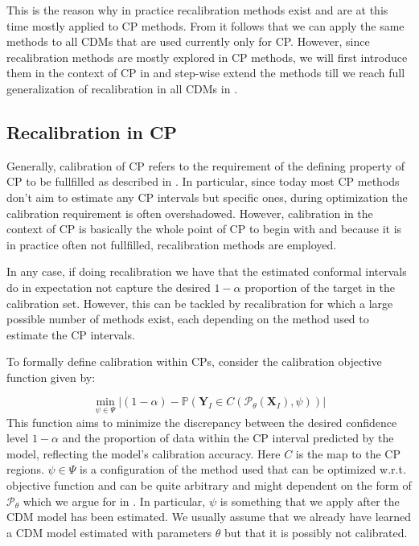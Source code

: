 This is the reason why in practice recalibration methods exist and are at this time mostly applied to CP methods. From  it follows that we can apply the same methods to all CDMs that are used currently only for CP. However, since recalibration methods are mostly explored in CP methods, we will first introduce them in the context of CP in  and step-wise extend the methods till we reach full generalization of recalibration in all CDMs in .

\subsection{Recalibration in CP}\label{sec:recalibration_cp}
Generally, calibration of CP refers to the requirement of the defining property of CP to be fullfilled as described in . In particular, since today most CP methods don't aim to estimate any CP intervals but specific ones, during optimization the calibration requirement is often overshadowed. However, calibration in the context of CP is basically the whole point of CP to begin with and because it is in practice often not fullfilled, recalibration methods are employed.

In any case, if doing recalibration we have that the estimated conformal intervals do in expectation not capture the desired $1 - \alpha$ proportion of the target in the calibration set. However, this can be tackled by recalibration for which a large possible number of methods exist, each depending on the method used to estimate the CP intervals.

To formally define calibration within CPs, consider the calibration objective function given by:

\begin{equation}
    \min_{\psi \in \Psi} |(1 - \alpha) - \mathbb{P}(\mathbf{Y}_I \in C(\mathscr{P}_{\theta}(\mathbf{X}_I), \psi))|
    \label{eq:calibration_objective_formal}
\end{equation}
This function aims to minimize the discrepancy between the desired confidence level \(1 - \alpha\) and the proportion of data within the CP interval predicted by the model, reflecting the model's calibration accuracy. Here $C$ is the map to the CP regions. $\psi\in\Psi$ is a configuration of the method used that can be optimized w.r.t. objective function and can be quite arbitrary and might dependent on the form of $\mathscr{P}_{\theta}$ which we argue for in . In particular, $\psi$ is something that we apply after the CDM model has been estimated. We usually assume that we already have learned a CDM model estimated with parameters $\theta$ but that it is possibly not calibrated.

